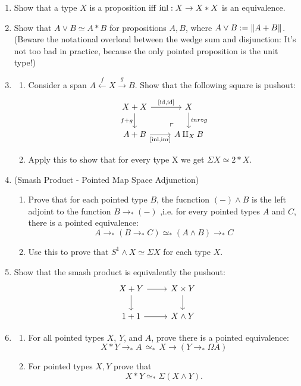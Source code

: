 \documentclass[10pt,oneside,leqno,openright]{memoir}
\begin{document}
\begin{enumerate}
\item Show that a type $X$ is a proposition iff $\operatorname{inl} : X \to X \ast X$ is an equivalence.

\item Show that $A\vee B \simeq A*B$ for propositions $A,B$, where
  $A\vee B := \lVert A+B\rVert$.  (Beware the notational overload between the wedge
  sum and disjunction: It's not too bad in practice, because the only pointed
  proposition is the unit type!)

\item \begin{enumerate}[label=(\roman*)]
    \item Consider a span $A \xleftarrow[]{f}X \xrightarrow[]{g}B$. Show that the following square is pushout:
    \[
    \begin{tikzcd}
      X + X \ar[d,"f+g"']\ar[r,"\text{[id,id]}"]\pocorner & X\ar[d,"{inr \circ g}"] \\
      A+B\ar[r,"\text{[inl,inr]}"'] & A \amalg_X B
    \end{tikzcd}
  \]
  \item Apply this to show that for every type X we get $\Sigma X \simeq 2*X$.
\end{enumerate}

\item (Smash Product - Pointed Map Space Adjunction) 
\begin{enumerate}[label=(\roman*)]
    \item Prove that for each pointed type $B$, the fucnction $ (-) \land B$ is the left adjoint to the function $B \to_* (-) $ ,i.e. for every pointed types $A$ and $C$, there is a pointed equivalence:
    $$
    A \to_* ( B \to_* C) \simeq_* (A \land B) \to_* C
    $$
    \item Use this to prove that  $S^1 \land X \simeq \Sigma X$ for each type $X$.
\end{enumerate}

\item Show that the smash product is equivalently the pushout:
  \[
    \begin{tikzcd}
      X + Y \ar[d]\ar[r] & X \times Y\ar[d]\\
      1 + 1 \ar[r] & X \land Y
    \end{tikzcd}
  \]
\item \begin{enumerate} [label=(\roman*)]
    \item For all pointed types $X$, $Y$, and $A$, prove there is a pointed equivalence:
    $$
    X * Y \to_* A \,\simeq_* \, X \to (Y \to_* \Omega A) 
    $$
    \item For pointed types $X,Y$ prove that
  \[X * Y \simeq_* \Sigma (X\wedge Y).\]
\end{enumerate} 


\end{enumerate}
\end{document}
